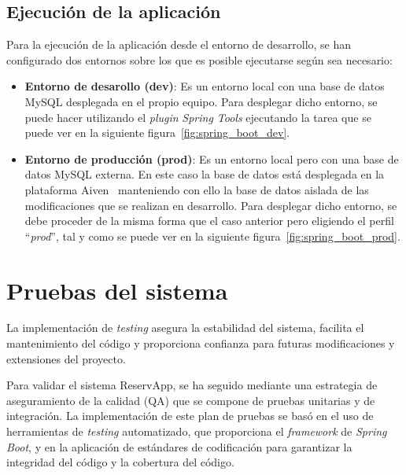 \subsection{Ejecución de la aplicación}

Para la ejecución de la aplicación desde el entorno de desarrollo, se han configurado dos entornos sobre los que es posible ejecutarse según sea necesario:
\begin{itemize}
   \item \textbf{Entorno de desarollo (dev)}: Es un entorno local con una base de datos MySQL desplegada en el propio equipo. Para desplegar dicho entorno, se puede hacer utilizando el \emph{plugin} \textit{Spring Tools} ejecutando la tarea que se puede ver en la siguiente figura~\ref{fig:spring_boot_dev}.

   
   \item \textbf{Entorno de producción (prod)}: Es un entorno local pero con una base de datos MySQL externa. En este caso la base de datos está desplegada en la plataforma Aiven~\cite{aiven} manteniendo con ello la base de datos aislada de las modificaciones que se realizan en desarrollo. Para desplegar dicho entorno, se debe proceder de la misma forma que el caso anterior pero eligiendo el perfil ``\emph{prod}'', tal y como se puede ver en la siguiente figura~\ref{fig:spring_boot_prod}.

\end{itemize}

\section{Pruebas del sistema}
La implementación de \emph{testing} asegura la estabilidad del sistema, facilita el mantenimiento del código y proporciona confianza para futuras modificaciones y extensiones del proyecto.

Para validar el sistema ReservApp, se ha seguido mediante una estrategia de aseguramiento de la calidad (QA) que se compone de pruebas unitarias y de integración. La implementación de este plan de pruebas se basó en el uso de herramientas de \emph{testing} automatizado, que proporciona el \emph{framework} de \textit{Spring Boot}, y en la aplicación de estándares de codificación para garantizar la integridad del código y la cobertura del código.

